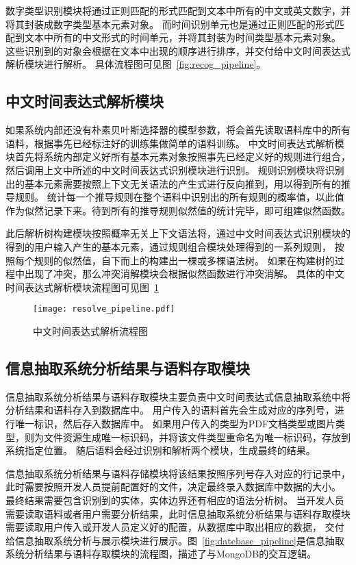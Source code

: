 数字类型识别模块将通过正则匹配的形式匹配到文本中所有的中文或英文数字，并将其封装成数字类型基本元素对象。
而时间识别单元也是通过正则匹配的形式匹配到文本中所有的中文形式的时间单元，并将其封装为时间类型基本元素对象。
这些识别到的对象会根据在文本中出现的顺序进行排序，并交付给中文时间表达式解析模块进行解析。
具体流程图可见图~\ref{fig:recog_pipeline}。

\subsection{中文时间表达式解析模块}

如果系统内部还没有朴素贝叶斯选择器的模型参数，将会首先读取语料库中的所有语料，根据事先已经标注好的训练集做简单的语料训练。
中文时间表达式解析模块首先将系统内部定义好所有基本元素对象按照事先已经定义好的规则进行组合，然后调用上文中所述的中文时间表达式识别模块进行识别。
规则识别模块将识别出的基本元素需要按照上下文无关语法的产生式进行反向推到，用以得到所有的推导规则。
统计每一个推导规则在整个语料中识别出的所有规则的概率值，以此值作为似然记录下来。待到所有的推导规则似然值的统计完毕，即可组建似然函数。

此后解析树构建模块按照概率无关上下文语法将，通过中文时间表达式识别模块的得到的用户输入产生的基本元素，通过规则组合模块处理得到的一系列规则，
按照每个规则的似然值，自下而上的构建出一棵或多棵语法树。
如果在构建树的过程中出现了冲突，那么冲突消解模块会根据似然函数进行冲突消解。
具体的中文时间表达式解析模块流程图可见图~\ref{fig:resolve_pipeline}

\begin{figure}[h]
  \centering
  \texttt{[image: resolve\_pipeline.pdf]}
  \caption{中文时间表达式解析流程图}
  \label{fig:resolve_pipeline}
\end{figure}

\subsection{信息抽取系统分析结果与语料存取模块}

信息抽取系统分析结果与语料存取模块主要负责中文时间表达式信息抽取系统中将分析结果和语料存入到数据库中。
用户传入的语料首先会生成对应的序列号，进行唯一标识，然后存入数据库中。
如果用户传入的类型为PDF文档类型或图片类型，则为文件资源生成唯一标识码，并将该文件类型重命名为唯一标识码，存放到系统指定位置。
随后语料会经过识别和解析两个模块，生成最终的结果。

信息抽取系统分析结果与语料存储模块将该结果按照序列号存入对应的行记录中，此时需要按照开发人员提前配置好的文件，决定最终录入数据库中数据的大小。
最终结果需要包含识别到的实体，实体边界还有相应的语法分析树。
当开发人员需要读取语料或者用户需要分析结果，此时信息抽取系统分析结果与语料存取模块需要读取用户传入或开发人员定义好的配置，从数据库中取出相应的数据，
交付给信息抽取系统分析与展示模块进行展示。图~\ref{fig:datebase_pipeline}是信息抽取系统分析结果与语料存取模块的流程图，描述了与MongoDB的交互逻辑。

